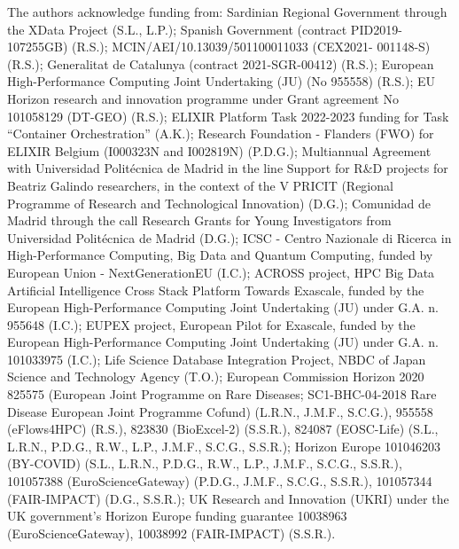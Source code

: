 \documentclass[10pt,letterpaper]{article}
\providecommand{\DIFaddtex}[1]{{\protect\color{blue}\uwave{#1}}} %
\providecommand{\DIFaddbegin}{} %
\providecommand{\DIFaddend}{} %
\providecommand{\DIFadd}[1]{\texorpdfstring{\DIFaddtex{#1}}{#1}} %
\newcommand{\DIFaddincludegraphics}[2][]{{\color{blue}\fbox{\DIFOincludegraphics[#1]{#2}}}} %
\DeclareRobustCommand{\DIFaddbegin}{\DIFOaddbegin \let\includegraphics\DIFaddincludegraphics} %
\DeclareRobustCommand{\DIFaddend}{\DIFOaddend \let\includegraphics\DIFOincludegraphics} %
\begin{document}
\iffalse
The authors acknowledge funding from: 
  Sardinian Regional Government through the XData Project (S.L., L.P.);
  Spanish Government (contract PID2019-107255GB) (R.S.);
  \DIFaddbegin \DIFadd{Spanish Government }\DIFaddend MCIN/AEI/10.13039/501100011033 (CEX2021- 001148-S) (R.S.);
  Generalitat de Catalunya (contract 2021-SGR-00412) (R.S.);
  European High-Performance Computing Joint Undertaking (JU) (No 955558) (R.S.);
  EU Horizon research and innovation programme under Grant agreement No 101058129 (DT-GEO) (R.S.);
  ELIXIR Platform Task 2022-2023 funding for Task ``Container
  Orchestration'' (A.K.);
  Research Foundation - Flanders (FWO) for ELIXIR Belgium (I000323N and I002819N) (P.D.G.);
  Multiannual Agreement with Universidad Politécnica de Madrid in the line Support for R\&D projects for Beatriz Galindo researchers, in the context of the V PRICIT (Regional Programme of Research and Technological Innovation) (D.G.);
  Comunidad de Madrid through the call Research Grants for Young Investigators from Universidad Politécnica de Madrid (D.G.);
  ICSC - Centro Nazionale di Ricerca in High-Performance Computing, Big Data and Quantum Computing, funded by European Union - NextGenerationEU (I.C.);
  ACROSS project, HPC Big Data Artificial Intelligence Cross Stack Platform Towards Exascale, funded by the European High-Performance Computing Joint Undertaking (JU) under G.A. n. 955648 (I.C.);
  EUPEX project, European Pilot for Exascale, funded by the European High-Performance Computing Joint Undertaking (JU) under G.A. n. 101033975 (I.C.);
  Life Science Database Integration Project, NBDC of Japan Science and
  Technology Agency (T.O.);
  European Commission Horizon 2020 
  825575 (European Joint Programme on Rare Diseases; SC1-BHC-04-2018 Rare Disease European Joint Programme Cofund) (L.R.N., J.M.F., S.C.G.),
  955558 (eFlows4HPC) (R.S.),
  823830
  (BioExcel-2) (S.S.R.), 
  824087
  (EOSC-Life) (S.L., L.R.N., P.D.G., R.W., L.P., J.M.F., S.C.G., S.S.R.);
  Horizon Europe 
  101046203 (BY-COVID) (S.L., L.R.N., P.D.G., R.W., L.P., J.M.F., S.C.G., S.S.R.),
  101057388 (EuroScienceGateway) (P.D.G., J.M.F., S.C.G., S.S.R.),
  101057344 (FAIR-IMPACT) (D.G., S.S.R.);
  UK Research and Innovation (UKRI) under the UK government's Horizon
  Europe funding guarantee 
  10038963 (EuroScienceGateway), 
  10038992 (FAIR-IMPACT) (S.S.R.).
\end{document}

